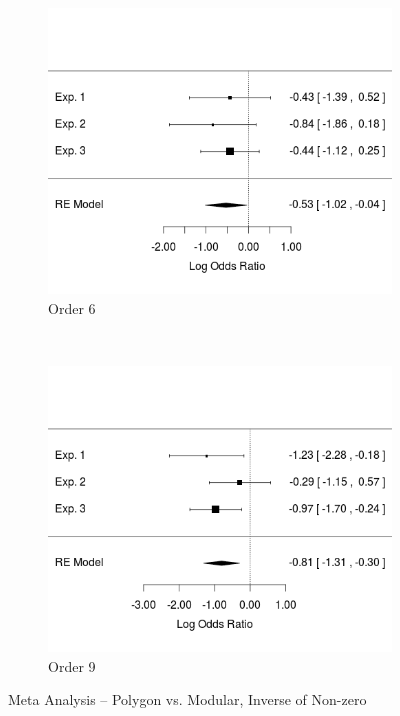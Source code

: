 \documentclass[11pt]{article}
\begin{document}
\begin{figure}[H]
\centering
\begin{subfigure}[c]{0.4\textwidth}
\centering
\includegraphics[width=\textwidth]{figures/meta/p_in_NZ_6.png}
\caption{Order 6}
\end{subfigure}
~
\begin{subfigure}[c]{0.4\textwidth}
\centering
\includegraphics[width=\textwidth]{figures/meta/p_in_NZ_9.png}
\caption{Order 9}
\end{subfigure}
\caption{Meta Analysis -- Polygon vs. Modular, Inverse of Non-zero}
\label{meta_inNZ_p}
\end{figure}\noindent 
\end{document}
